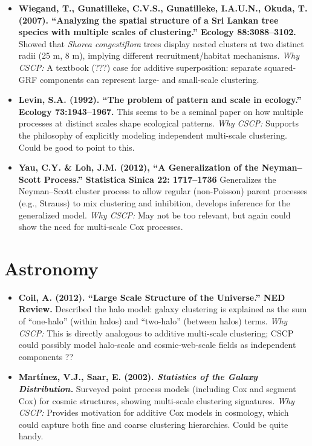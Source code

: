 \documentclass[11pt]{article}
\begin{document}
	\begin{itemize}
		\item \textbf{Wiegand, T., Gunatilleke, C.V.S., Gunatilleke, I.A.U.N., Okuda, T. (2007). ``Analyzing the spatial structure of a Sri Lankan tree species with multiple scales of clustering.'' Ecology 88:3088--3102.}  
		Showed that \emph{Shorea congestiflora} trees display nested clusters at two distinct radii (25 m, 8 m), implying different recruitment/habitat mechanisms.  
		\emph{Why CSCP:} A textbook (???) case for additive superposition: separate squared-GRF components can represent large- and small-scale clustering.
		
		\item \textbf{Levin, S.A. (1992). ``The problem of pattern and scale in ecology.'' Ecology 73:1943--1967.}  
		This seems to be a seminal paper on how multiple processes at distinct scales shape ecological patterns.  
		\emph{Why CSCP:} Supports the philosophy of explicitly modeling independent multi-scale clustering. Could be good to point to this.
		
		\item \textbf{Yau, C.Y. \& Loh, J.M. (2012), ``A Generalization of the Neyman–Scott Process.'' Statistica Sinica 22: 1717–1736}  
		Generalizes the Neyman–Scott cluster process to allow regular (non-Poisson) parent processes (e.g., Strauss) to mix clustering and inhibition, develops inference for the generalized model.  
		\emph{Why CSCP:} May not be too relevant, but again could show the need for multi-scale Cox processes.
	\end{itemize}
	
	\section*{Astronomy}
	
	\begin{itemize}
		\item \textbf{Coil, A. (2012). ``Large Scale Structure of the Universe.'' NED Review.}  
		Described the halo model: galaxy clustering is explained as the sum of ``one-halo'' (within halos) and ``two-halo'' (between halos) terms.  
		\emph{Why CSCP:} This is directly analogous to additive multi-scale clustering; CSCP could possibly model halo-scale and cosmic-web-scale fields as independent components   ??
		
		\item \textbf{Martínez, V.J., Saar, E. (2002). \emph{Statistics of the Galaxy Distribution.}}  
		Surveyed point process models (including Cox and segment Cox) for cosmic structures, showing multi-scale clustering signatures.  
		\emph{Why CSCP:} Provides motivation for additive Cox models in cosmology, which could capture both fine and coarse clustering hierarchies. Could be quite handy.
	\end{itemize}
	
\end{document}
